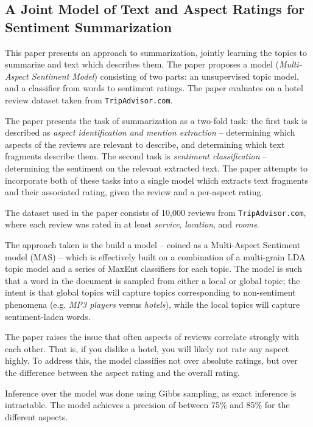\documentclass[letter,12pt]{article}
\begin{document}
\subsection{A Joint Model of Text and Aspect Ratings for Sentiment Summarization \cite{2008titov-summarization}}

This paper presents an approach to summarization, jointly learning the topics to summarize and text which
	describes them.
The paper proposes a model ({\em Multi-Aspect Sentiment Model}) consisting of two parts: 
	an unsupervised topic model, and a classifier from words to sentiment ratings.
The paper evaluates on a hotel review dataset taken from {\tt TripAdvisor.com}.

The paper presents the task of summarization as a two-fold task: the first task
	is described as {\em aspect identification and mention extraction} -- determining which aspects of the
	reviews are relevant to describe, and determining which text fragments describe them.
The second task is {\em sentiment classification} -- determining the sentiment on the
	relevant extracted text.
The paper attempts to incorporate both of these tasks into a single model which extracts text fragments
	and their associated rating, given the review and a per-aspect rating.

The dataset used in the paper consists of 10,000 reviews from {\tt TripAdvisor.com}, where each
review was rated in at least {\em service}, {\em location}, and {\em rooms}.

The approach taken is the build a model -- coined as a Multi-Aspect Sentiment model (MAS) --
	which is effectively built on a combination of a multi-grain LDA topic model and a series of MaxEnt
	classifiers for each topic.
The model is such that a word in the document is sampled from either a local or global topic;
	the intent is that global topics will capture topics corresponding to non-sentiment phenomena
	(e.g. {\em MP3 players} versus {\em hotels}), while the local topics will capture sentiment-laden
	words.

The paper raises the issue that often aspects of reviews correlate strongly with each other.
That is, if you dislike a hotel, you will likely not rate any aspect highly.
To address this, the model classifies not over absolute ratings, but over the difference between
	the aspect rating and the overall rating.

Inference over the model was done using Gibbs sampling, as exact inference is intractable.
The model achieves a precision of between 75\% and 85\% for the different aspects.



\end{document}
